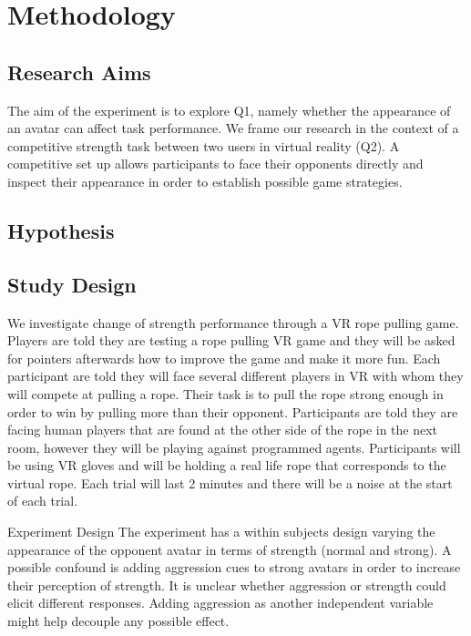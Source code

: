 
\section{Methodology}
\label{section:methodology}
\subsection{Research Aims}
The aim of the experiment is to explore Q1, namely whether the appearance of an avatar can affect task performance. We frame our research in the context of a competitive strength task between two users in virtual reality (Q2). A competitive set up allows participants to face their opponents directly and inspect their appearance in order to establish possible game strategies.
\subsection{Hypothesis}
\subsection{Study Design}
We investigate change of strength performance through a VR rope pulling game. Players are told they are testing a rope pulling VR game and they will be asked for pointers afterwards how to improve the game and make it more fun. 
Each participant are told they will face several different players in VR with whom they will compete at pulling a rope. Their task is to pull the rope strong enough in order to win by pulling more than their opponent. Participants are told they are facing human players that are found at the other side of the rope in the next room, however they will be playing against programmed agents. Participants will be using VR gloves and will be holding a real life rope that corresponds to the virtual rope. Each trial will last 2 minutes and there will be a noise at the start of each trial.


Experiment Design
The experiment has a within subjects design varying the appearance of the opponent avatar in terms of strength (normal and strong). A possible confound is adding aggression cues to strong avatars in order to increase their perception of strength. It is unclear whether aggression or strength could elicit different responses. Adding aggression as another independent variable might help decouple any possible effect.

